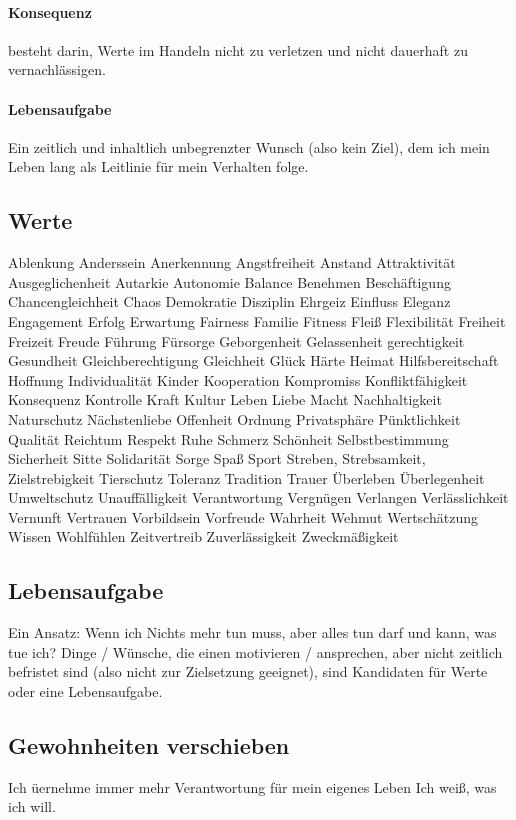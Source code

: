\paragraph{Konsequenz} besteht darin, Werte im Handeln nicht zu verletzen und nicht dauerhaft zu vernachlässigen.

\paragraph{Lebensaufgabe} Ein zeitlich und inhaltlich unbegrenzter Wunsch (also kein Ziel), dem ich mein Leben lang als Leitlinie für mein Verhalten folge.

\subsection{Werte}

Ablenkung
Anderssein
Anerkennung
Angstfreiheit
Anstand
Attraktivität
Ausgeglichenheit
Autarkie
Autonomie
Balance
Benehmen
Beschäftigung
Chancengleichheit
Chaos
Demokratie
Disziplin
Ehrgeiz
Einfluss
Eleganz
Engagement
Erfolg
Erwartung
Fairness
Familie
Fitness
Fleiß
Flexibilität
Freiheit
Freizeit
Freude
Führung
Fürsorge
Geborgenheit
Gelassenheit
gerechtigkeit
Gesundheit
Gleichberechtigung
Gleichheit
Glück
Härte
Heimat
Hilfsbereitschaft
Hoffnung
Individualität
Kinder
Kooperation
Kompromiss
Konfliktfähigkeit
Konsequenz
Kontrolle
Kraft
Kultur
Leben
Liebe
Macht
Nachhaltigkeit
Naturschutz
Nächstenliebe
Offenheit
Ordnung
Privatsphäre
Pünktlichkeit
Qualität
Reichtum
Respekt
Ruhe
Schmerz
Schönheit
Selbstbestimmung
Sicherheit
Sitte
Solidarität
Sorge
Spaß
Sport
Streben, Strebsamkeit, Zielstrebigkeit
Tierschutz
Toleranz
Tradition
Trauer
Überleben
Überlegenheit
Umweltschutz
Unauffälligkeit
Verantwortung
Vergnügen
Verlangen
Verlässlichkeit
Vernunft
Vertrauen
Vorbildsein
Vorfreude
Wahrheit
Wehmut
Wertschätzung
Wissen
Wohlfühlen
Zeitvertreib
Zuverlässigkeit
Zweckmäßigkeit

\subsection{Lebensaufgabe}
Ein Ansatz: Wenn ich Nichts mehr tun muss, aber alles tun darf und kann, was tue ich?
Dinge / Wünsche, die einen motivieren / ansprechen, aber nicht zeitlich befristet sind (also nicht zur Zielsetzung geeignet), sind Kandidaten für Werte oder eine Lebensaufgabe.

\subsection*{Gewohnheiten verschieben}
Ich üernehme immer mehr Verantwortung für mein eigenes Leben
Ich weiß, was ich will.
